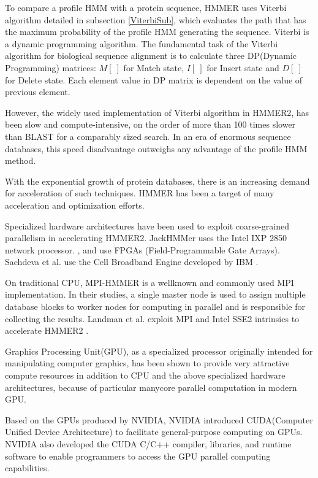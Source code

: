 To compare a profile HMM with a protein sequence, HMMER uses Viterbi algorithm detailed in subsection \ref{ViterbiSub}, which evaluates the path that has the maximum probability of the profile HMM generating the sequence. Viterbi is a dynamic programming algorithm.
The fundamental task of the Viterbi algorithm for biological sequence alignment is to calculate three DP(Dynamic Programming) matrices: $M[~]$ for Match state, $I[~]$ for Insert state and $D[~]$ for Delete state. Each element value in DP matrix is dependent on the value of previous element.

However, the widely used implementation of Viterbi algorithm in HMMER2, has been slow and compute-intensive, on the order of more than 100 times slower than BLAST for a comparably sized search. In an era of enormous sequence databases, this speed disadvantage outweighs any advantage of the profile HMM method.

With the exponential growth of protein databases, there is an increasing demand for acceleration of such techniques. HMMER has been a target of many acceleration and optimization efforts. 

Specialized hardware architectures have been used to exploit coarse-grained parallelism in accelerating HMMER2. JackHMMer \citep{Wun} uses the Intel IXP 2850 network processor. \citep{Maddimsetty}, \citep{Derrien} and \citep{Oliver} use FPGAs (Field-Programmable Gate Arrays). Sachdeva et al. use the Cell Broadband Engine developed by IBM \citep{Sachdeva}.

On traditional CPU, MPI-HMMER \citep{Walters2006} is a wellknown and commonly used MPI implementation. In their studies, a single master node is used to assign multiple database blocks to worker nodes for computing in parallel and is responsible for collecting the results. Landman et al. exploit MPI and Intel SSE2 intrinsics to accelerate HMMER2 \citep{Landman}.

Graphics Processing Unit(GPU), as a specialized processor originally intended for manipulating computer graphics, has been shown to provide very attractive compute resources in addition to CPU and the above specialized hardware architectures, because of particular manycore parallel computation in modern GPU.

Based on the GPUs produced by NVIDIA, NVIDIA introduced CUDA(Computer Unified Device Architecture) to facilitate general-purpose computing on GPUs. NVIDIA also developed the CUDA C/C++ compiler, libraries, and runtime software to enable programmers to access the GPU parallel computing capabilities.


